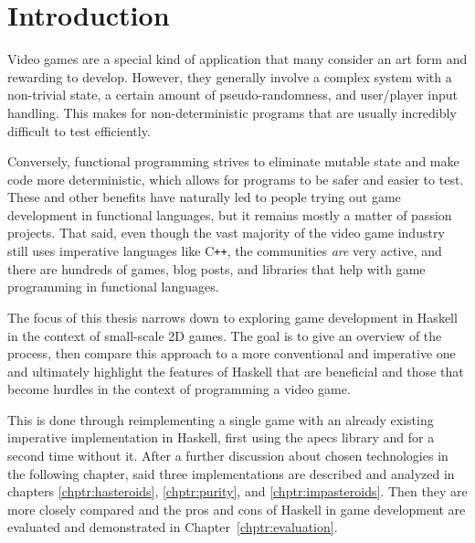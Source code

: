\documentclass[
  digital, %
  color,   %
  table,   %
  oneside, %
  lof,     %
  lot,     %
]{fithesis3}
\newcommand{\cpp}{C\nolinebreak\texttt{+}\nolinebreak\texttt{+}}
\begin{document}
\chapter*{Introduction}
\label{chptr:introduction}


Video games are a special kind of application that many consider an art form
and rewarding to develop. However, they generally involve a complex system
with a non-trivial state, a certain amount of pseudo-randomness,
and user/player input handling. This makes for non-deterministic
programs that are usually incredibly difficult to test efficiently.

Conversely, functional programming strives to eliminate
mutable state and make code more deterministic, which allows for
programs to be safer and easier to test.
These and other benefits have naturally led to people
trying out game development in functional languages, but
it remains mostly a matter of passion projects.
That said, even though the vast majority of the video game industry
still uses imperative languages like \cpp{}, the communities
\emph{are} very active, and there are hundreds of games,
blog posts, and libraries that help with
game programming in functional languages.

The focus of this thesis narrows down to exploring game development
in Haskell in the context of small-scale 2D games. The goal is
to give an overview of the process, then compare this approach
to a more conventional and imperative one
and ultimately highlight the features of Haskell that are beneficial
and those that become hurdles in the context of programming a video game.

This is done through reimplementing a single game with an already existing
imperative implementation in Haskell,
first using the apecs library
and for a second time without it. After a further discussion
about chosen technologies in the following chapter,
said three implementations are described and analyzed
in chapters \ref{chptr:hasteroids}, \ref{chptr:purity}, and \ref{chptr:impasteroids}.
Then they are more closely compared
and the pros and cons of Haskell in game development are
evaluated and demonstrated in Chapter~\ref{chptr:evaluation}.
\end{document}
